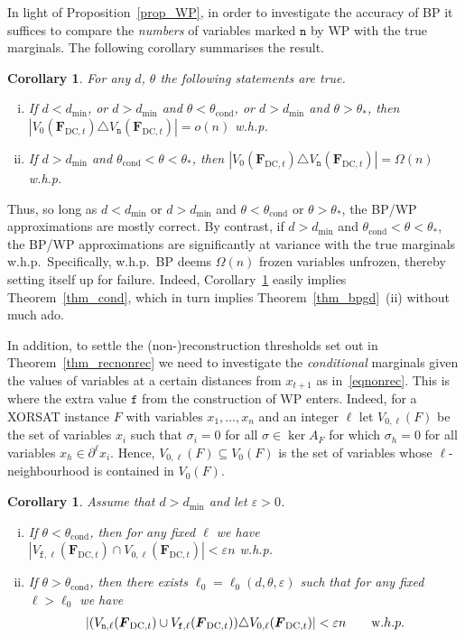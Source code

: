 \documentclass[10pt,reqno]{amsart}
\numberwithin{equation}{section}
\renewcommand{\vec}[1]{\boldsymbol{#1}}
\renewcommand{\subset}{\subseteq}
\newcommand\dmin{d_{\mathrm{min}}}
\newcommand{\FDC}[1]{\PHI_{\mathrm{DC},{#1}}}
\newcommand{\tcond}{\theta_{\mathrm{cond}}}
\newcommand{\frz}{V_0}
\newcommand{\frozen}{\mathtt{f}}
\newcommand{\nll}{\mathtt{n}}
\newcommand{\fzn}{\frozen}
\newcommand\PHI{\vec F}
\newcommand\eps{\varepsilon}
\newcommand{\whp}{w.h.p.}
\newcommand\Prop{Proposition}
\newcommand\Thm{Theorem}
\newcommand\Cor{Corollary}
\newtheorem{corollary}[definition]{Corollary}
\begin{document}
In light of \Prop~\ref{prop_WP}, in order to investigate the accuracy of BP it suffices to compare the {\em numbers} of variables marked $\nll$ by WP with the true marginals.
The following corollary summarises the result.

\begin{corollary}\label{cor_nll}
	For any $d$, $\theta$ the following statements are true.
	\begin{enumerate}[(i)]
		\item If $d<\dmin$, \emph{or} $d>\dmin$ and $\theta<\tcond$, \emph{or} $d>\dmin$ and $\theta>\theta_*$, then $|\frz(\FDC{t})\triangle V_{\nll}(\FDC{t})|=o(n)$ \whp
		\item If $d>\dmin$ and $\tcond<\theta<\theta_*$, then $|\frz(\FDC{t})\triangle V_{\nll}(\FDC{t})|=\Omega(n)$ \whp
	\end{enumerate}
\end{corollary}

Thus, so long as $d<\dmin$ or $d>\dmin$ and $\theta<\tcond$ or $\theta>\theta_*$, the BP/WP approximations are mostly correct.
By contrast, if $d>\dmin$ and $\tcond<\theta<\theta_*$, the BP/WP approximations are significantly at variance with the true marginals \whp\
Specifically, \whp\ BP deems $\Omega(n)$ frozen variables unfrozen, thereby setting itself up for failure.
Indeed, \Cor~\ref{cor_nll} easily implies \Thm~\ref{thm_cond}, which in turn implies \Thm~\ref{thm_bpgd}~(ii) without much ado.

In addition, to settle the (non-)reconstruction thresholds set out in \Thm~\ref{thm_recnonrec} we need to investigate the {\em conditional} marginals given the values of variables at a certain distances from $x_{t+1}$ as in~\eqref{eqnonrec}.
This is where the extra value $\fzn$ from the construction of WP enters.
Indeed, for a XORSAT instance $F$ with variables $x_1,\ldots,x_n$ and an integer $\ell$ let $V_{0,\ell}(F)$ be the set of variables $x_i$ such that $\sigma_i=0$ for all $\sigma\in\ker A_F$ for which $\sigma_h=0$ for all variables $x_h\in\partial^\ell x_i$.
Hence, $V_{0,\ell}(F) \subset V_0(F)$ is the set of variables whose $\ell$-neighbourhood is contained in $V_0(F)$. 

\begin{corollary}\label{lem_fzn}
	Assume that $d>\dmin$ and let $\eps>0$. 
	\begin{enumerate}[(i)]
		\item If $\theta<\tcond$, then for any fixed $\ell$ we have $|V_{\fzn,\ell}(\FDC{t})\cap V_{0,\ell}(\FDC{t})|<\eps n$ \whp\
		\item If $\theta>\tcond$, then there exists $\ell_0=\ell_0(d,\theta,\eps)$ such that for any fixed $\ell>\ell_0$ we have
			\begin{align*}
				|(V_{\nll,\ell}(\FDC{t})\cup V_{\fzn,\ell}(\FDC{t}))\triangle V_{0,\ell}(\FDC{t})|<\eps n\qquad\mbox\whp
			\end{align*}
	\end{enumerate}
\end{corollary}
\end{document}
